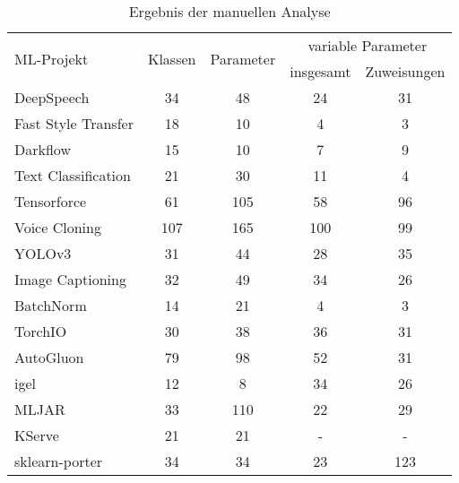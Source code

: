 \documentclass[german,bachelor]{swsLeipzig}
\begin{document}
\begin{table}[H]
\small
\begin{center}
\setlength{\tabcolsep}{5pt}
\begin{tabular}[h]{l|c|c|c|c} %
\hline
\multirow{2}{*}{ML-Projekt} & \multirow{2}{*}{Klassen}   & \multirow{2}{*}{Parameter} &   \multicolumn{2}{c}{variable Parameter}\\
                            &           &           &   insgesamt   &   Zuweisungen \\
\hline \hline
DeepSpeech                  & 34        & 48        & 24            & 31\\
Fast Style Transfer         & 18        & 10        & 4             & 3\\
Darkflow                    & 15        & 10        & 7             & 9\\
Text Classification         & 21        & 30        & 11            & 4\\
Tensorforce                 & 61        & 105       & 58            & 96\\
\hline
Voice Cloning               & 107       & 165       & 100           & 99\\
YOLOv3                      & 31        & 44        & 28            & 35\\
Image Captioning            & 32        & 49        & 34            & 26\\
BatchNorm                   & 14        & 21        & 4             & 3\\
TorchIO                     & 30        & 38        & 36            & 31\\
\hline
AutoGluon                   & 79        & 98        & 52            & 31\\
igel                        & 12        & 8         & 34            & 26\\
MLJAR                       & 33        & 110       & 22            & 29\\
KServe                      & 21        & 21        & -             & -\\
sklearn-porter              & 34        & 34        & 23            & 123\\
\hline
\end{tabular}
\caption{Ergebnis der manuellen Analyse} \label{manuell}
\end{center}
\end{table}
\end{document}
